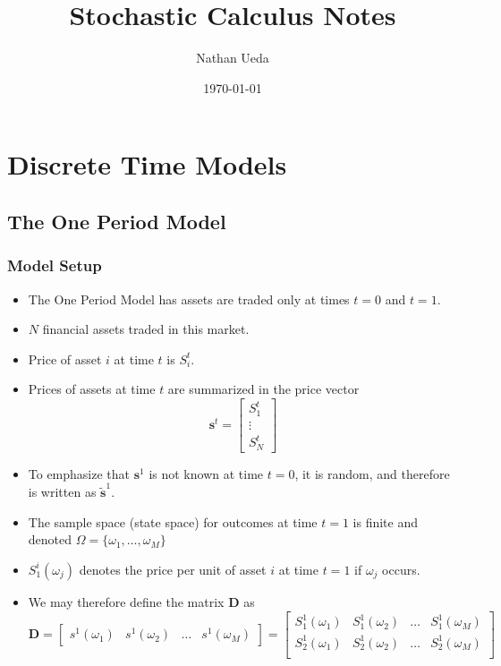 \documentclass[11pt]{article}
\title{Stochastic Calculus Notes}
\author{Nathan Ueda}
\date{\today}
\begin{document}
\maketitle 
\pagebreak
\tableofcontents 
\pagebreak

\section{Discrete Time Models}
\subsection{The One Period Model}
\subsubsection{Model Setup}
\begin{itemize}
    \item The One Period Model has assets are traded only at times $t=0$ and $t=1$.
    \item $N$ financial assets traded in this market.
    \item Price of asset $i$ at time $t$ is $S_i^t$.
    \item Prices of assets at time $t$ are summarized in the price vector 
    \[ \boldsymbol{s}^t = \begin{bmatrix}
        S_1^t \\
        \vdots \\ 
        S_N^t
    \end{bmatrix}\]
    \item To emphasize that $\boldsymbol{s}^1$ is not known at time $t=0$, it is random, and 
    therefore is written as $\boldsymbol{\tilde{s}}^1$.
    \item The sample space (state space) for outcomes at time $t=1$ is finite and denoted 
    $\Omega = \{\omega_1, \ldots, \omega_M\}$ 
    \item $S_1^i(\omega_j)$ denotes the price per unit of asset $i$ at time $t=1$ if $\omega_j$
    occurs. 
    \item We may therefore define the matrix $\boldsymbol{D}$ as 
    \[
    \boldsymbol{D} = 
    \begin{bmatrix}
        s^1(\omega_1) & s^1(\omega_2) & \hdots & s^1(\omega_M) 
    \end{bmatrix} =
    \begin{bmatrix}
        S_1^1(\omega_1) & S_1^1(\omega_2) & \hdots & S_1^1(\omega_M) \\
        S_2^1(\omega_1) & S_2^1(\omega_2) & \hdots & S_2^1(\omega_M) \\

\end{bmatrix}\]
\end{itemize}
\end{document}
